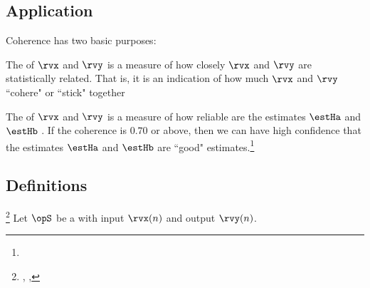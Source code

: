 \subsection{Application}
Coherence has two basic purposes:
\begin{enume}
  \item The  of $\rvx$ and $\rvy$ is a measure of how closely
        $\rvx$ and $\rvy$ are statistically related. 
        That is, it is an indication of how much $\rvx$ and $\rvy$ 
        ``cohere" or ``stick" together 
  \item The  of $\rvx$ and $\rvy$ is a measure of how reliable
        are the estimates $\estHa$ and $\estHb$ .
        If the coherence is $0.70$ or above, then we can have high confidence that
        the estimates $\estHa$ and $\estHb$ are ``good" 
        estimates.\footnote{}
\end{enume}

\subsection{Definitions}
\begin{definition}
\footnote{
  ,
  ,
  }
\label{def:Cxy}
\label{def:oCxy}
Let $\opS$ be a  with input $\rvx(n)$ and output $\rvy(n)$.
\end{definition}

